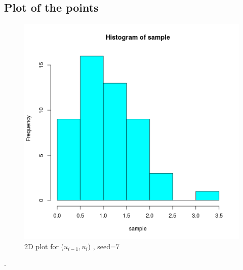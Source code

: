 \documentclass{article}
\begin{document}
		\subsection{Plot of the points}
			\begin{figure}[ht]
  				\includegraphics[width=\linewidth]{pic/que3.png}
 			 	\caption{2D plot for ($u_{i-1},u_i$) , seed=7}
  			\label{fig:hist1}
		\end{figure}
		.
	
\end{document}
